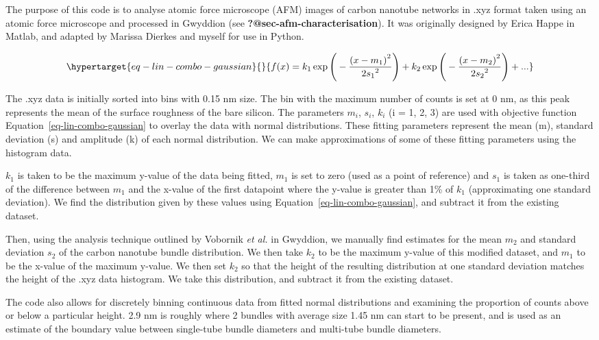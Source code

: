 \documentclass[
  a4paper,
]{scrbook}
\begin{document}
The purpose of this code is to analyse atomic force microscope (AFM)
images of carbon nanotube networks in .xyz format taken using an atomic
force microscope and processed in Gwyddion (see
\textbf{?@sec-afm-characterisation}). It was originally designed by
Erica Happe in Matlab, and adapted by Marissa Dierkes and myself for use
in Python.

\begin{equation}\protect\hypertarget{eq-lin-combo-gaussian}{}{
f(x) = k_1\exp{\Bigg(-\frac{{(x-m_1)}^{2}}{{2s_1}^{2}}\Bigg)} + k_2\exp{\Bigg(-\frac{{(x-m_2)}^{2}}{{2s_2}^{2}}\Bigg)} + ...
}\label{eq-lin-combo-gaussian}\end{equation}

The .xyz data is initially sorted into bins with 0.15 nm size. The bin
with the maximum number of counts is set at 0 nm, as this peak
represents the mean of the surface roughness of the bare silicon. The
parameters \(m_i\), \(s_i\), \(k_i\) (i = 1, 2, 3) are used with
objective function Equation~\ref{eq-lin-combo-gaussian} to overlay the
data with normal distributions. These fitting parameters represent the
mean (m), standard deviation (s) and amplitude (k) of each normal
distribution. We can make approximations of some of these fitting
parameters using the histogram data.

\(k_1\) is taken to be the maximum y-value of the data being fitted,
\(m_1\) is set to zero (used as a point of reference) and \(s_1\) is
taken as one-third of the difference between \(m_1\) and the x-value of
the first datapoint where the y-value is greater than 1\% of \(k_1\)
(approximating one standard deviation). We find the distribution given
by these values using Equation~\ref{eq-lin-combo-gaussian}, and subtract
it from the existing dataset.

Then, using the analysis technique outlined by Vobornik \emph{et al.}
\autocite{Vobornik2023} in Gwyddion, we manually find estimates for the
mean \(m_2\) and standard deviation \(s_2\) of the carbon nanotube
bundle distribution. We then take \(k_2\) to be the maximum y-value of
this modified dataset, and \(m_1\) to be the x-value of the maximum
y-value. We then set \(k_2\) so that the height of the resulting
distribution at one standard deviation matches the height of the .xyz
data histogram. We take this distribution, and subtract it from the
existing dataset.

The code also allows for discretely binning continuous data from fitted
normal distributions and examining the proportion of counts above or
below a particular height. 2.9 nm is roughly where 2 bundles with
average size 1.45 nm can start to be present, and is used as an estimate
of the boundary value between single-tube bundle diameters and
multi-tube bundle diameters.
\end{document}
